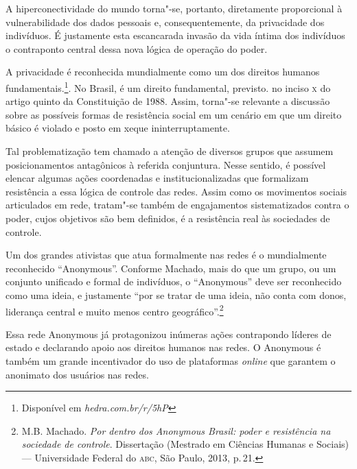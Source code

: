 A hiperconectividade do mundo torna"-se, portanto, diretamente
proporcional à vulnerabilidade dos dados pessoais e, consequentemente,
da privacidade dos indivíduos. É justamente esta escancarada invasão da
vida íntima dos indivíduos o contraponto central dessa nova lógica de
operação do poder.

A privacidade é reconhecida mundialmente como um dos direitos humanos
fundamentais.\footnote{Disponível em \textit{hedra.com.br/r/5hP}}. No Brasil, é um direito fundamental, previsto.
no inciso \textsc{x} do artigo quinto da Constituição de 1988.
Assim, torna"-se relevante a discussão sobre as possíveis formas de
resistência social em um cenário em que um direito básico é violado e
posto em xeque ininterruptamente.

Tal problematização tem chamado a atenção de diversos grupos que assumem
posicionamentos antagônicos à referida conjuntura. Nesse sentido, é
possível elencar algumas ações coordenadas e institucionalizadas que
formalizam resistência a essa lógica de controle das redes. Assim como
os movimentos sociais articulados em rede, tratam"-se também de
engajamentos sistematizados contra o poder, cujos objetivos são bem
definidos, é a resistência real às sociedades de controle.

Um dos grandes ativistas que atua formalmente nas redes é o mundialmente
reconhecido ``Anonymous''. Conforme Machado, mais do que um
grupo, ou um conjunto unificado e formal de indivíduos, o ``Anonymous''
deve ser reconhecido como uma ideia, e justamente ``por se tratar de
uma ideia, não conta com donos, liderança central e muito menos centro
geográfico''.\footnote{M.B. Machado. \textit{Por dentro dos Anonymous Brasil: poder e
resistência na sociedade de controle}. Dissertação (Mestrado em Ciências
Humanas e Sociais) --- Universidade Federal do \textsc{abc}, São Paulo, 2013, p.\,21.}

Essa rede Anonymous já protagonizou inúmeras ações contrapondo líderes
de estado e declarando apoio aos direitos humanos nas redes. O Anonymous
é também um grande incentivador do uso de plataformas \textit{online} que
garantem o anonimato dos usuários nas redes.

